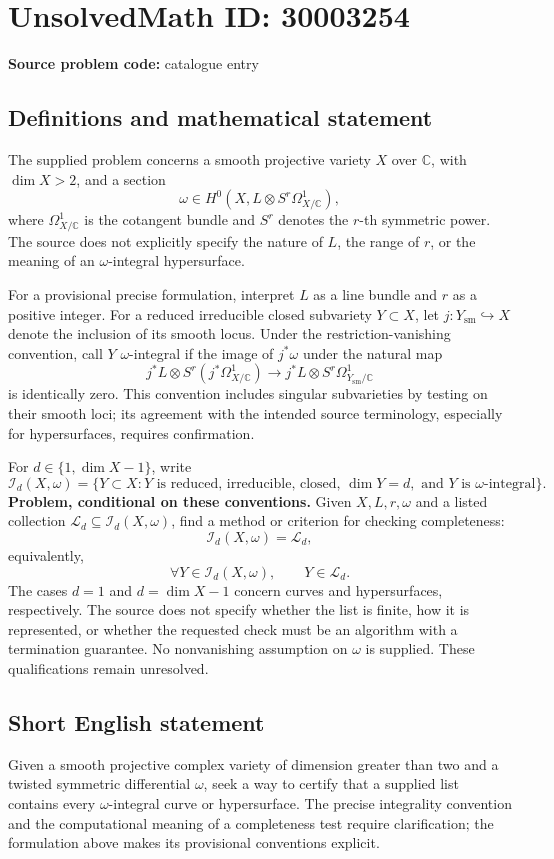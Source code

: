 \documentclass[11pt]{article}
\newcommand{\C}{\mathbb{C}}
\begin{document}
\section*{UnsolvedMath ID: 30003254}
\textbf{Source problem code:} catalogue entry
\subsection{Definitions and mathematical statement}
The supplied problem concerns a smooth projective variety \(X\) over \(\C\), with \(\dim X>2\), and a section
\[
\omega\in H^0\!\left(X,L\otimes S^r\Omega^1_{X/\C}\right),
\]
where \(\Omega^1_{X/\C}\) is the cotangent bundle and \(S^r\) denotes the \(r\)-th symmetric power. The source does not explicitly specify the nature of \(L\), the range of \(r\), or the meaning of an \(\omega\)-integral hypersurface.

For a provisional precise formulation, interpret \(L\) as a line bundle and \(r\) as a positive integer. For a reduced irreducible closed subvariety \(Y\subset X\), let \(j:Y_{\mathrm{sm}}\hookrightarrow X\) denote the inclusion of its smooth locus. Under the restriction-vanishing convention, call \(Y\) \(\omega\)-integral if the image of \(j^*\omega\) under the natural map
\[
j^*L\otimes S^r(j^*\Omega^1_{X/\C})
\longrightarrow
j^*L\otimes S^r\Omega^1_{Y_{\mathrm{sm}}/\C}
\]
is identically zero. This convention includes singular subvarieties by testing on their smooth loci; its agreement with the intended source terminology, especially for hypersurfaces, requires confirmation.

For \(d\in\{1,\dim X-1\}\), write
\[
\mathcal I_d(X,\omega)=
\{Y\subset X:Y\text{ is reduced, irreducible, closed, }\dim Y=d,
\text{ and }Y\text{ is }\omega\text{-integral}\}.
\]
\textbf{Problem, conditional on these conventions.} Given \(X,L,r,\omega\) and a listed collection \(\mathcal L_d\subseteq\mathcal I_d(X,\omega)\), find a method or criterion for checking completeness:
\[
\mathcal I_d(X,\omega)=\mathcal L_d,
\]
equivalently,
\[
\forall Y\in\mathcal I_d(X,\omega),\qquad Y\in\mathcal L_d.
\]
The cases \(d=1\) and \(d=\dim X-1\) concern curves and hypersurfaces, respectively. The source does not specify whether the list is finite, how it is represented, or whether the requested check must be an algorithm with a termination guarantee. No nonvanishing assumption on \(\omega\) is supplied. These qualifications remain unresolved.
\subsection{Short English statement}
Given a smooth projective complex variety of dimension greater than two and a twisted symmetric differential \(\omega\), seek a way to certify that a supplied list contains every \(\omega\)-integral curve or hypersurface. The precise integrality convention and the computational meaning of a completeness test require clarification; the formulation above makes its provisional conventions explicit.
\end{document}

